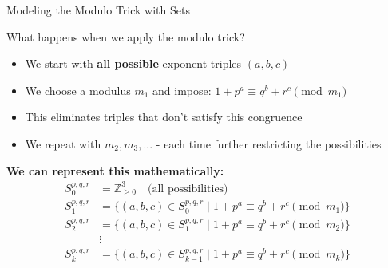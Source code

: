 \begin{frame}{Modeling the Modulo Trick with Sets}
    \begin{block}{What happens when we apply the modulo trick?}
        \begin{itemize}
            \item We start with \textbf{all possible} exponent triples $(a,b,c)$
            \item We choose a modulus $m_1$ and impose: $1+p^a \equiv q^b+r^c \pmod{m_1}$
            \item This eliminates triples that don't satisfy this congruence
            \item We repeat with $m_2, m_3, ...$ - each time further restricting the possibilities
        \end{itemize}
    \end{block}
    
    \vspace{0.3cm}
    \textbf{We can represent this mathematically:}
    \begin{align*}
        S_0^{p,q,r} &= \mathbb{Z}_{\geq 0}^3 \quad \text{(all possibilities)} \\
        S_1^{p,q,r} &= \{(a,b,c) \in S_0^{p,q,r} \; | \; 1+p^a \equiv q^b+r^c \pmod{m_1}\} \\
        S_2^{p,q,r} &= \{(a,b,c) \in S_1^{p,q,r} \; | \; 1+p^a \equiv q^b+r^c \pmod{m_2}\} \\
        &\vdots \\
        S_k^{p,q,r} &= \{(a,b,c) \in S_{k-1}^{p,q,r} \; | \; 1+p^a \equiv q^b+r^c \pmod{m_k}\}
    \end{align*}
\end{frame}

